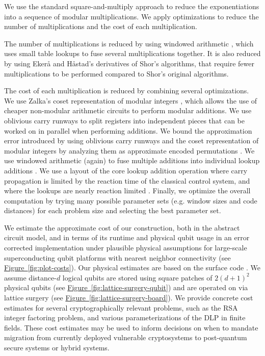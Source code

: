 \documentclass[superscriptaddress,notitlepage,longbibliography]{revtex4-1}
\theoremstyle{definition}
\theoremstyle{definition}
\newcommand{\fig}[1]{\hyperref[fig:#1]{Figure~\ref*{fig:#1}}}
\begin{document}
We use the standard square-and-multiply approach to reduce the exponentiations into a sequence of modular multiplications.
We apply optimizations to reduce the number of multiplications and the cost of each multiplication.

The number of multiplications is reduced by using windowed arithmetic \cite{van2005fastexponentiation,gidney2019windowedarithmetic}, which uses small table lookups to fuse several multiplications together.
It is also reduced by using Ekerå and Håstad's derivatives \cite{ekeraa2016modifying, ekeraa2017quantum, ekeraa2017pp, ekeraa2018general} of Shor's algorithms, that require fewer multiplications to be performed  compared to Shor's original algorithms.

The cost of each multiplication is reduced by combining several optimizations.
We use Zalka's coset representation of modular integers \cite{zalka2006pure}, which allows the use of cheaper non-modular arithmetic circuits to perform modular additions.
We use oblivious carry runways \cite{gidney2019approximatepermutation} to split registers into independent pieces that can be worked on in parallel when performing additions.
We bound the approximation error introduced by using oblivious carry runways and the coset representation of modular integers by analyzing them as approximate encoded permutations \cite{gidney2019approximatepermutation}.
We use windowed arithmetic (again) to fuse multiple additions into individual lookup additions \cite{gidney2019windowedarithmetic}.
We use a layout of the core lookup addition operation where carry propagation is limited by the reaction time of the classical control system, and where the lookups are nearly reaction limited \cite{gidney2019autoccz}.
Finally, we optimize the overall computation by trying many possible parameter sets (e.g. window sizes and code distances) for each problem size and selecting the best parameter set.

We estimate the approximate cost of our construction, both in the abstract circuit model, and in terms of its runtime and physical qubit usage in an error corrected implementation under plausible physical assumptions for large-scale superconducting qubit platforms with nearest neighbor connectivity (see \fig{plot-costs}).
Our physical estimates are based on the surface code \cite{fowler2012surfacecodereview}.
We assume distance-$d$ logical qubits are stored using square patches of $2(d+1)^2$ physical qubits (see \fig{lattice-surgery-qubit}) and are operated on via lattice surgery \cite{horsman2012latticesurgery,fowler2018} (see \fig{lattice-surgery-board}).
We provide concrete cost estimates for several cryptographically relevant problems, such as the RSA integer factoring problem, and various parameterizations of the DLP in finite fields.
These cost estimates may be used to inform decisions on when to mandate migration from currently deployed vulnerable cryptosystems to post-quantum secure systems or hybrid systems.
\end{document}
